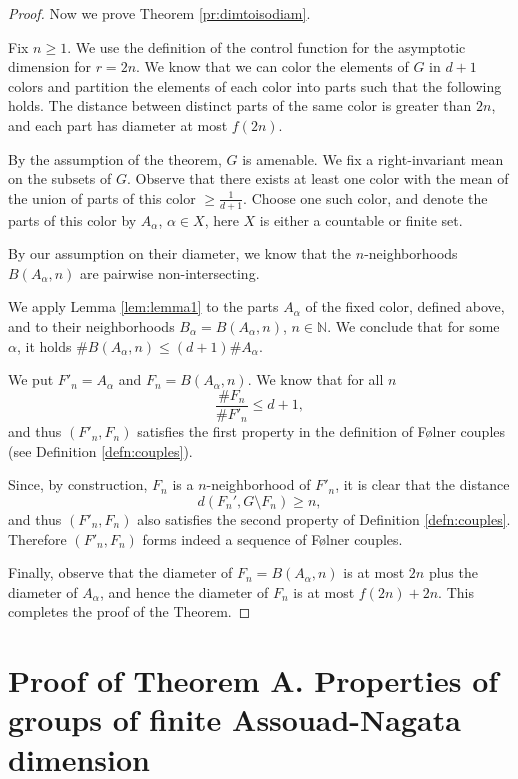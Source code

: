 \documentclass{amsart}
\numberwithin{figure}{section}
\theoremstyle{plain}
\theoremstyle{definition}
\begin{document}
\begin{proof}
Now we  prove  Theorem \ref{pr:dimtoisodiam}.

Fix $n\ge 1$.
We use the definition of the control function  for the asymptotic dimension for $r=2n$.
We know that  we can color the elements of 
 $G$ in  $d+1$ colors and partition the elements of each color into parts such that the following holds. The distance between distinct parts of the same color is greater than $2n$,
 and each part has diameter at most $f(2n)$.

By the assumption of the theorem,  $G$ is amenable. We fix a right-invariant mean on the subsets of $G$.
Observe that there exists at least one color with the mean of the union of parts
of this color
 $\geqslant \frac{1}{d+1}$. Choose one  such color, and 
  denote the parts of this color by $A_{\alpha}$, $\alpha \in X$, here $X$ is either a countable or finite set.

By our assumption on their diameter, we know that the 
   $n$-neighborhoods  $B(A_{\alpha}, n)$ are pairwise non-intersecting.

We apply Lemma \ref{lem:lemma1} to the parts  $A_{\alpha}$ of the fixed color, defined
above,
and to their neighborhoods  $B_{\alpha}=B(A_{\alpha}, n)$, $n \in \mathbb{N}$.
We conclude that for some $\alpha$, it holds $\#B(A_{\alpha},n) \leqslant (d+1)\#A_\alpha$.


We  put $F'_n = A_{\alpha}$ and $F_n = B(A_\alpha, n)$.
We know that for all $n$
$$
\frac{\# F_n}{\# F'_{n}} \le d+1,
$$
and thus $(F'_n, F_n)$ satisfies the first property in the definition of F{\o}lner couples (see Definition \ref{defn:couples}).

Since, by construction, $F_n$ is a $n$-neighborhood of $F'_n$, it is clear that the distance 
$$
 d (F_n', G \setminus F_n) \ge n,
$$
and thus $(F'_n, F_n)$ also satisfies the second property of Definition \ref{defn:couples}. Therefore  $(F'_n, F_n)$ forms indeed a sequence  of F{\o}lner couples.

Finally, observe that the diameter of $F_n = B(A_\alpha, n)$ is at most $2n$ plus
the diameter of $A_{\alpha}$, and hence the diameter of $F_n$ is at most
$f(2n)+2n$. This completes the proof of the Theorem.
 
\end{proof}

\section{Proof of Theorem A. Properties of groups of finite Assouad-Nagata dimension}
\end{document}
